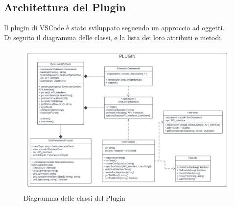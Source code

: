 \documentclass{article}
\begin{document}
\subsection{Architettura del Plugin}
Il plugin di VSCode è stato sviluppato seguendo un approccio ad oggetti.\\
Di seguito il diagramma delle classi, e la lista dei loro attributi e metodi.
\begin{figure}[H]
    \centering
    \includegraphics[width=\textwidth]{documenti/imgUML/plugin_class_diagram.png}
    \caption{Diagramma delle classi del Plugin}
    \label{fig:enter-label}
\end{figure}
\end{document}
